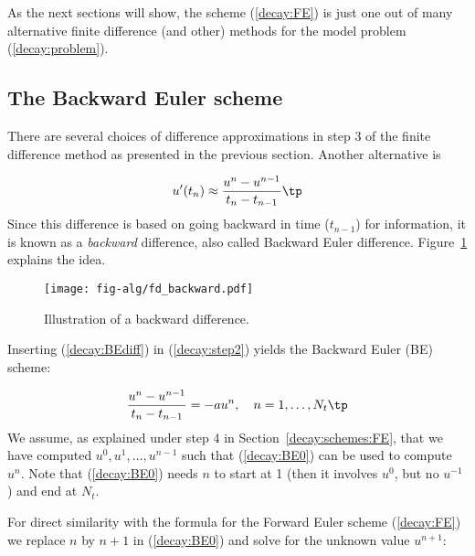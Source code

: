 \documentclass[graybox,sectrefs,envcountresetchap,open=right,final]{svmonodo}
\begin{document}
As the next sections will show, the scheme (\ref{decay:FE}) is just one
out of many alternative finite difference (and other) methods for
the model problem (\ref{decay:problem}).

\subsection{The Backward Euler scheme}
\label{decay:schemes:BE}

 

There are several choices of difference approximations in step 3 of
the finite difference method as presented in the previous section.
Another alternative is

\begin{equation}
u^{\prime}(t_n) \approx \frac{u^{n}-u^{n-1}}{t_{n}-t_{n-1}}\tp
\label{decay:BEdiff}
\end{equation}
Since this difference is based on going backward in time ($t_{n-1}$)
for information, it is known as a \emph{backward} difference, also called
Backward Euler difference.
Figure~\ref{decay:sketch:BE} explains the idea.

\begin{figure}[!ht]  %
  \centerline{\texttt{[image: fig-alg/fd\_backward.pdf]}}
  \caption{
  Illustration of a backward difference. \label{decay:sketch:BE}
  }
\end{figure}


Inserting (\ref{decay:BEdiff}) in (\ref{decay:step2}) yields
the Backward Euler (BE) scheme:

\begin{equation}
\frac{u^{n}-u^{n-1}}{t_{n}-t_{n-1}} = -a u^n,\quad n=1,\ldots,N_t\tp
\label{decay:BE0}
\end{equation}
We assume, as explained under step 4 in Section~\ref{decay:schemes:FE},
that we have computed $u^0, u^1, \ldots, u^{n-1}$ such that
(\ref{decay:BE0}) can be used to compute $u^n$. Note that
(\ref{decay:BE0}) needs $n$ to start at 1 (then it involves $u^0$, but
no $u^{-1}$) and end at $N_t$.

For direct similarity with the formula for the
Forward Euler scheme (\ref{decay:FE})
we replace $n$ by $n+1$ in (\ref{decay:BE0}) and solve for the
unknown value $u^{n+1}$:
\end{document}
